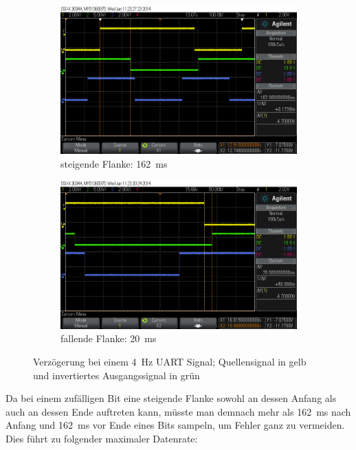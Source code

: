 \documentclass[12pt,a4paper]{article}
\begin{document}
\begin{figure}[H]
  \centering
  \begin{subfigure}[b]{0.6\textwidth}
    \includegraphics[width=\textwidth]{../measurements/20140611/4Hz_rising_edge/scope_2.png}
    \caption{steigende Flanke: \SI{162}{\milli\second}}
    \label{fig:uart_4hz_rising_edge}
  \end{subfigure}
  \begin{subfigure}[b]{0.6\textwidth}
    \includegraphics[width=\textwidth]{../measurements/20140611/4Hz_falling_edge/scope_6.png}
    \caption{fallende Flanke: \SI{20}{\milli\second}}
    \label{fig:uart_4hz_falling_edge}
  \end{subfigure}
  \caption{Verzögerung bei einem \SI{4}{\hertz} UART Signal; Quellensignal in gelb und invertiertes Ausgangssignal in grün}
  \label{fig:uart_4hz_edge}
\end{figure}

Da bei einem zufälligen Bit eine steigende Flanke sowohl an dessen Anfang als auch an dessen Ende auftreten kann, müsste man demnach mehr als \SI{162}{\milli\second} nach Anfang und \SI{162}{\milli\second} vor Ende eines Bits sampeln, um Fehler ganz zu vermeiden. Dies führt zu folgender maximaler Datenrate:
\end{document}
